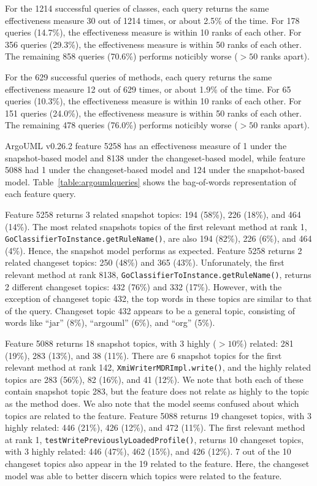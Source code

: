 For the 1214 successful queries of classes,
each query returns the same effectiveness measure 30 out of 1214 times, or about 2.5\% of the time.
For 178 queries (14.7\%), the effectiveness measure is within 10 ranks of each other.
For 356 queries (29.3\%), the effectiveness measure is within 50 ranks of each other.
The remaining 858 queries (70.6\%) performs noticibly worse ($> 50$ ranks apart).

For the 629 successful queries of methods,
each query returns the same effectiveness measure 12 out of 629 times, or about 1.9\% of the time.
For 65 queries (10.3\%), the effectiveness measure is within 10 ranks of each other.
For 151 queries (24.0\%), the effectiveness measure is within 50 ranks of each other.
The remaining 478 queries (76.0\%) performs noticibly worse ($> 50$ ranks apart).




ArgoUML v0.26.2 feature 5258 has an effectiveness measure of 1 under the
snapshot-based model and 8138 under the changeset-based model, while feature
5088 had 1 under the changeset-based model and 124 under the snapshot-based
model.  Table~\ref{table:argoumlqueries} shows the bag-of-words representation
of each feature query.

Feature 5258 returns 3 related snapshot topics: 194 (58\%), 226 (18\%), and 464 (14\%).
The most related snapshots topics of the first relevant method at rank 1,
\texttt{GoClassifierToInstance.getRuleName()},
are also 194 (82\%), 226 (6\%), and 464 (4\%).
Hence, the snapshot model performs as expected.
Feature 5258 returns 2 related changeset topics: 250 (48\%) and 365 (43\%).
Unforunately, the first relevant method at rank 8138,
\texttt{GoClassifierToInstance.getRuleName()},
returns 2 different changeset topics: 432 (76\%) and 332 (17\%).
However, with the exception of changeset topic 432, the top words in these
topics are similar to that of the query. Changeset topic 432 appears to be a general
topic, consisting of words like ``jar'' (8\%), ``argouml'' (6\%), and ``org'' (5\%).

Feature 5088 returns 18 snapshot topics, with 3 highly ($> 10\%$) related: 281 (19\%), 283 (13\%), and 38 (11\%).
There are 6 snapshot topics for the first relevant method at rank 142,
\texttt{XmiWriterMDRImpl.write()},
and the highly related topics are 283 (56\%), 82 (16\%), and 41 (12\%).
We note that both each of these contain snapshot topic 283,
but the feature does not relate as highly to the topic as the method does.
We also note that the model seems confused about which topics are related to the feature.
Feature 5088 returns 19 changeset topics, with 3 highly related: 446 (21\%), 426 (12\%), and 472 (11\%).
The first relevant method at rank 1,
\texttt{testWritePreviouslyLoadedProfile()},
returns 10 changeset topics, with 3 highly related: 446 (47\%), 462 (15\%), and 426 (12\%).
7 out of the 10 changeset topics also appear in the 19 related to the feature.
Here, the changeset model was able to better discern which topics were related to the feature.


